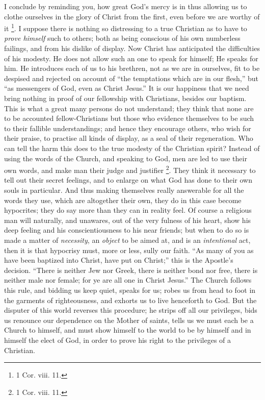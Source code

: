 I conclude by reminding you, how great God's mercy is
in thus allowing us to clothe ourselves in the glory of
Christ from the first, even before we are worthy of it \footnote{1 Cor. viii. 11.}. I suppose there is nothing
so distressing to a true Christian as to have to \emph{prove
himself} such to others; both as being conscious of
his own numberless failings, and from his dislike of
display. Now Christ has anticipated the difficulties of
his modesty. He does not allow such an one to speak for
himself; He speaks for him. He introduces each of us to
his brethren, not as we are in ourselves, fit to be
despised and rejected on account of ``the temptations
which are in our flesh,'' but ``as messengers of
God, even as Christ Jesus.'' It is our happiness that
we need bring nothing in proof of our fellowship with
Christians, besides our baptism. This is what a great
many persons do not understand; they think that none are
to be accounted fellow-Christians but those who evidence
themselves to be such to their fallible understandings;
and hence they encourage others, who wish for their
praise, to practise all kinds of display, as a seal of
their regeneration. Who can tell the harm this does to
the true modesty of the Christian spirit? Instead of
using the words of the Church, and speaking to God, men
are led to use their own words, and make man their judge
and justifier \footnote{1 Cor. viii. 11.}. They think it necessary
to tell out their secret feelings, and to enlarge on what
God has done to their own souls in particular. And thus
making themselves really answerable for all the words
they use, which are altogether their own, they do in this
case become hypocrites; they do say more than they can in
reality feel. Of course a religious man will naturally,
and unawares, out of the very fulness of his heart, show
his deep feeling and his conscientiousness to his near
friends; but when to do so is made a matter of \emph{necessity},
an \emph{object} to be aimed at, and is an \emph{intentional}
act, then it is that hypocrisy must, more or less, sully
our faith. ``As many of you as have been baptized
into Christ, have put on Christ;'' this is the
Apostle's decision. ``There is neither Jew nor Greek,
there is neither bond nor free, there is neither male nor
female; for ye are all one in Christ Jesus.'' The
Church follows this rule, and bidding us keep quiet,
speaks for us; robes us from head to foot in the garments
of righteousness, and exhorts us to live henceforth to
God. But the disputer of this world reverses this
procedure; he strips off all our privileges, bids us
renounce our dependence on the Mother of saints, tells us
we must each be a Church to himself, and must show
himself to the world to be by himself and in himself the
elect of God, in order to prove his right to the
privileges of a Christian.

